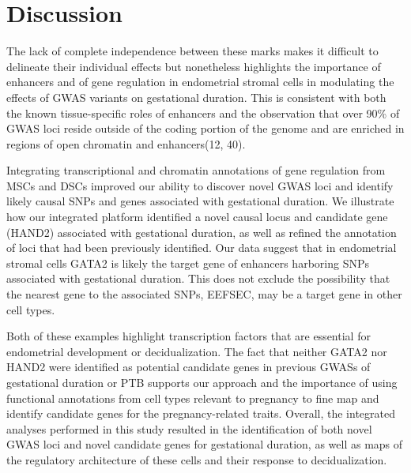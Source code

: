 \section{Discussion}\label{sec:org53f1196}

 The lack of complete independence between these marks makes it difficult to delineate their individual effects but nonetheless highlights the importance of enhancers and of gene regulation in endometrial stromal cells in modulating the effects of GWAS variants on gestational duration. This is consistent with both the known tissue-specific roles of enhancers and the observation that over 90\% of GWAS loci reside outside of the coding portion of the genome and are enriched in regions of open chromatin and enhancers(12, 40). 

    Integrating transcriptional and chromatin annotations of gene regulation from MSCs and DSCs improved our ability to discover novel GWAS loci and identify likely causal SNPs and genes associated with gestational duration. We illustrate how our integrated platform identified a novel causal locus and candidate gene (HAND2) associated with gestational duration, as well as refined the annotation of loci that had been previously identified. Our data suggest that in endometrial stromal cells GATA2 is likely the target gene of enhancers harboring SNPs associated with gestational duration. This does not exclude the possibility that the nearest gene to the associated SNPs, EEFSEC, may be a target gene in other cell types.  

    Both of these examples highlight transcription factors that are essential for endometrial development or decidualization. The fact that neither GATA2 nor HAND2 were identified as potential candidate genes in previous GWASs of gestational duration or PTB supports our approach and the importance of using functional annotations from cell types relevant to pregnancy to fine map and identify candidate genes for the pregnancy-related traits. Overall, the integrated analyses performed in this study resulted in the identification of both novel GWAS loci and novel candidate genes for gestational duration, as well as maps of the regulatory architecture of these cells and their response to decidualization. 

